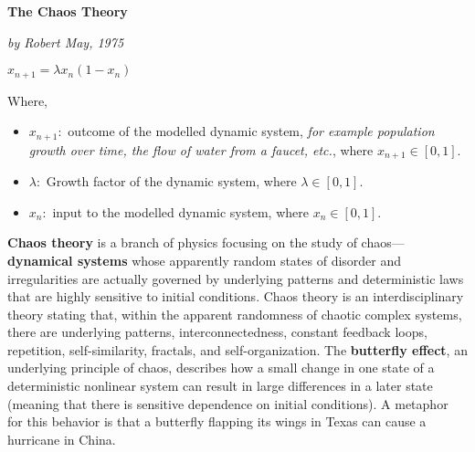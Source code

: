 \centerline{\huge \textbf{The Chaos Theory}}
\centerline{\textit{by Robert May, 1975}}

\begin{center}
\centerline{\huge $x_{n+1}=\lambda x_n(1-x_n)$}
\end{center}
Where,
\begin{itemize}
    \item $x_{n+1}:$ outcome of the modelled dynamic system, \textit{for example population growth over time, the flow of water from a faucet, etc.}, where $x_{n+1}\in[0,1]$.
    \item $\lambda:$ Growth factor of the dynamic system, where $\lambda\in [0,1]$.
    \item $x_n:$ input to the modelled dynamic system, where $x_{n}\in[0,1]$.  
\end{itemize}
\textbf{Chaos theory} is a branch of physics focusing on the study of chaos—\textbf{dynamical systems} whose apparently random states of disorder and irregularities are actually governed by underlying patterns and deterministic laws that are highly sensitive to initial conditions. Chaos theory is an interdisciplinary theory stating that, within the apparent randomness of chaotic complex systems, there are underlying patterns, interconnectedness, constant feedback loops, repetition, self-similarity, fractals, and self-organization. The \textbf{butterfly effect}, an underlying principle of chaos, describes how a small change in one state of a deterministic nonlinear system can result in large differences in a later state (meaning that there is sensitive dependence on initial conditions). A metaphor for this behavior is that a butterfly flapping its wings in Texas can cause a hurricane in China.
